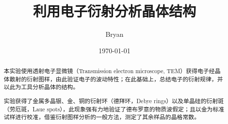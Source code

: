 \documentclass[aps,pre,12pt,preprint,%
	onecolumn,showpacs,showkeys,nofootinbib]{revtex4-1}
\begin{document}
	\title{%
	\texstringonly{\hfil\\[2\baselineskip]}
	\sf\LARGE%
		利用电子衍射分析晶体结构%
	\texstringonly{\vspace{3ex}}}
	\author{\fangsong\large%
		Bryan%
	\vspace{2mm}}
	\date{\today}
	
\begin{abstract}
\vspace{10mm}
\begin{spacing}{1.5}\normalsize
\setlength{\parskip}{.3\baselineskip}
%	
	本实验使用透射电子显微镜（Transmission electron microscope, TEM）获得电子经晶体散射的衍射图样，由此验证电子的波动特性；在此基础上，总结电子的衍射规律，并以此为工具分析晶体的结构。
	
	实验获得了金属多晶银、金、铜的衍射环（德拜环，Debye rings）以及单晶硅的衍射斑（劳厄斑，Laue spots），此现象强有力地验证了德布罗意的物质波假定；且以金为标准试样进行校准，借鉴衍射图样分析的一般方法，测定了其余样品的晶格常数。
\end{spacing}
\end{abstract}

\maketitle
\thispagestyle{titlepagestyle}
%
\end{document}
